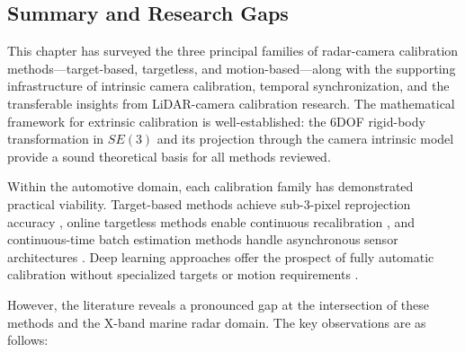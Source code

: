 \subsection{Summary and Research Gaps}\label{sec:calib_gaps}

This chapter has surveyed the three principal families of radar-camera calibration methods---target-based, targetless, and motion-based---along with the supporting infrastructure of intrinsic camera calibration, temporal synchronization, and the transferable insights from LiDAR-camera calibration research. The mathematical framework for extrinsic calibration is well-established: the 6DOF rigid-body transformation in $SE(3)$ and its projection through the camera intrinsic model provide a sound theoretical basis for all methods reviewed.

Within the automotive domain, each calibration family has demonstrated practical viability. Target-based methods achieve sub-3-pixel reprojection accuracy \cite{persic2019extrinsic}, online targetless methods enable continuous recalibration \cite{wang2023online}, and continuous-time batch estimation methods handle asynchronous sensor architectures \cite{furgale2013unified}. Deep learning approaches offer the prospect of fully automatic calibration without specialized targets or motion requirements \cite{schneider2017regnet, arXiv2025rcautocalib}.

However, the literature reveals a pronounced gap at the intersection of these methods and the X-band marine radar domain. The key observations are as follows:

